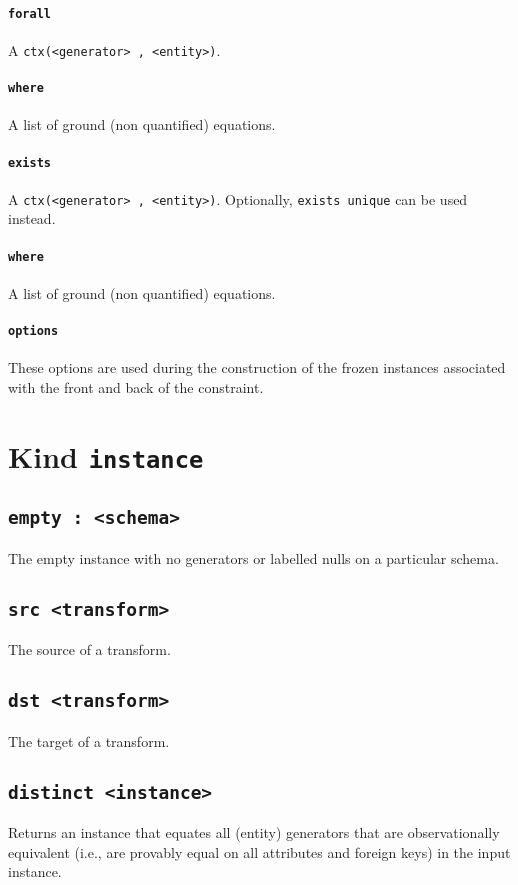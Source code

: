 \documentclass[10pt]{book}
\begin{document}
\subsubsection{{\tt forall}}
A {\tt ctx(<generator> , <entity>)}.

\subsubsection{{\tt where}}
A list of ground (non quantified) equations.

\subsubsection{{\tt exists}}
A {\tt ctx(<generator> , <entity>)}.  Optionally, {\tt exists unique} can be used instead.

\subsubsection{{\tt where}}
A list of ground (non quantified) equations.

\subsubsection{{\tt options}}
These options are used during the construction of the frozen instances associated with the front and back of the constraint.

\chapter{Kind {\tt instance}}
\section{{\tt empty : <schema>}}
The empty instance with no generators or labelled nulls on a particular schema.

\section{{\tt src <transform>}}
The source of a transform.

\section{{\tt dst <transform>}}
The target of a transform.

\section{{\tt distinct <instance>}}
Returns an instance that equates all (entity) generators that are observationally equivalent (i.e., are provably equal on all attributes and foreign keys) in the input instance.  
\end{document}
